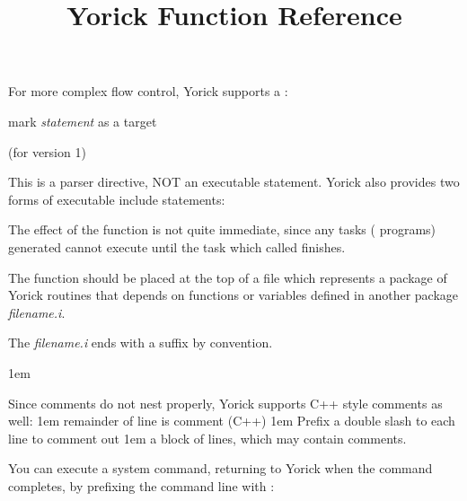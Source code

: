 For more complex flow control, Yorick supports a :

       {mark {\it statement} as a  target}

\copyrightnotice

\par\vfill\supereject


\title{Yorick Function Reference}

\centerline{(for version 1)}



This is a parser directive, NOT an executable statement.  Yorick also
provides two forms of executable include statements:


The effect of the  function is not quite immediate, since
any tasks ( programs) generated cannot execute until the
task which called  finishes.

The  function should be placed at the top of a file which
represents a package of Yorick routines that depends on functions or
variables defined in another package {\it filename.i}.

The {\it filename.i\/} ends with a  suffix by convention.


\hglue1em 

Since  comments do not nest properly, Yorick supports
C++ style comments as well:
\begindemo
\hglue1em  remainder of line is comment (C++)
\hglue1em \kbd{//} Prefix a double slash to each line to comment out
\hglue1em \kbd{//} a block of lines, which may contain comments.
\enddemo


You can execute a system command, returning to Yorick when
the command completes, by prefixing the command line with \kbd{\$}:

